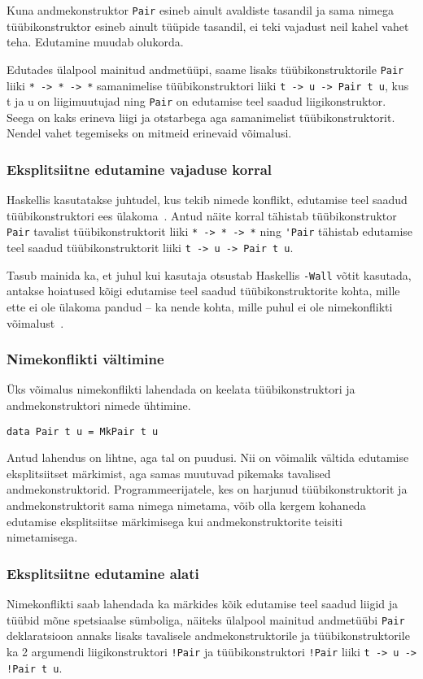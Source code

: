 \documentclass[12pt]{article}
\begin{document}
      Kuna andmekonstruktor \verb!Pair! esineb ainult avaldiste tasandil ja sama nimega tüübikonstruktor esineb ainult tüüpide tasandil, ei teki vajadust neil kahel vahet teha. Edutamine muudab olukorda.

      Edutades ülalpool mainitud andmetüüpi, saame lisaks tüübikonstruktorile \verb!Pair! liiki \verb!* -> * -> *! samanimelise tüübikonstruktori liiki \verb!t -> u -> Pair t u!, kus t ja u on liigimuutujad ning \verb!Pair! on edutamise teel saadud liigikonstruktor. Seega on kaks erineva liigi ja otstarbega aga samanimelist tüübikonstruktorit. Nendel vahet tegemiseks on mitmeid erinevaid võimalusi.
      \subsubsection{Eksplitsiitne edutamine vajaduse korral}
        Haskellis kasutatakse juhtudel, kus tekib nimede konflikt, edutamise teel saadud tüübikonstruktori ees ülakoma~\cite{Giv}. Antud näite korral tähistab tüübikonstruktor \verb!Pair! tavalist tüübikonstruktorit liiki \verb!* -> * -> *! ning \verb!'Pair! tähistab edutamise teel saadud tüübikonstruktorit liiki \verb!t -> u -> Pair t u!.

        Tasub mainida ka, et juhul kui kasutaja otsustab Haskellis \verb!-Wall! võtit kasutada, antakse hoiatused kõigi edutamise teel saadud tüübikonstruktorite kohta, mille ette ei ole ülakoma pandud -- ka nende kohta, mille puhul ei ole nimekonflikti võimalust~\cite{Gla}.
      \subsubsection{Nimekonflikti vältimine}
        Üks võimalus nimekonflikti lahendada on keelata tüübikonstruktori ja andmekonstruktori nimede ühtimine.

        \begin{verbatim}data Pair t u = MkPair t u\end{verbatim}

        Antud lahendus on lihtne, aga tal on puudusi. Nii on võimalik vältida edutamise eksplitsiitset märkimist, aga samas muutuvad pikemaks tavalised andmekonstruktorid. Programmeerijatele, kes on harjunud tüübikonstruktorit ja andmekonstruktorit sama nimega nimetama, võib olla kergem kohaneda edutamise eksplitsiitse märkimisega kui andmekonstruktorite teisiti nimetamisega.
      \subsubsection{Eksplitsiitne edutamine alati}
        Nimekonflikti saab lahendada ka märkides kõik edutamise teel saadud liigid ja tüübid mõne spetsiaalse sümboliga, näiteks ülalpool mainitud andmetüübi \verb!Pair! deklaratsioon annaks lisaks tavalisele andmekonstruktorile ja tüübikonstruktorile ka 2 argumendi liigikonstruktori \verb"!Pair" ja tüübikonstruktori \verb"!Pair" liiki \verb"t -> u -> !Pair t u".
\end{document}
